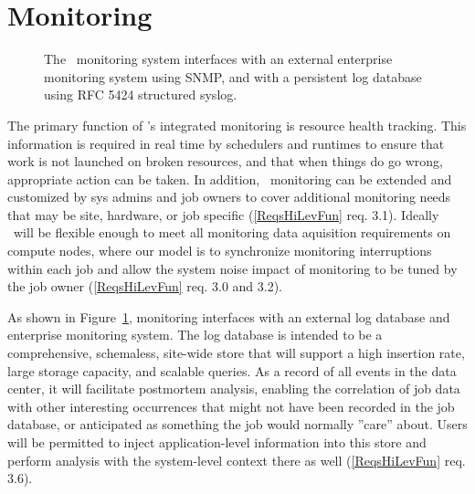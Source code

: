\section{Monitoring}
\label{sect:monitor}

\begin{figure}
\centering
{}
\caption{The \ngrm\ monitoring system interfaces with an external
enterprise monitoring system using SNMP, and with a persistent log
database using RFC 5424 structured syslog.}
\label{FigMonExt}
\end{figure}

The primary function of \ngrm's integrated monitoring is resource
health tracking.  This information is required in real time by schedulers
and runtimes to ensure that work is not launched on broken resources,
and that when things do go wrong, appropriate action can be taken.
In addition, \ngrm\ monitoring can be extended and customized
by sys admins and job owners to cover additional monitoring needs
that may be site, hardware, or job specific
(\ref{ReqsHiLevFun} req. 3.1).
Ideally \ngrm\ will be flexible enough to meet all
monitoring data aquisition requirements on compute nodes,
where our model is to synchronize monitoring interruptions within each job
and allow the system noise impact of monitoring to be tuned by the job owner
(\ref{ReqsHiLevFun} req. 3.0 and 3.2).

As shown in Figure~\ref{FigMonExt}, monitoring interfaces with an external
log database and enterprise monitoring system.
The log database is intended to be a comprehensive, schemaless, site-wide
store that will support a high insertion rate, large storage capacity,
and scalable queries.
As a record of all events in the data center, it will facilitate
postmortem analysis, enabling the correlation of job data with other
interesting occurrences that might not have been recorded in the job
database, or anticipated as something the job would normally ''care'' about.
Users will be permitted to inject application-level information into this
store and perform analysis with the system-level context there as well
(\ref{ReqsHiLevFun} req. 3.6).

